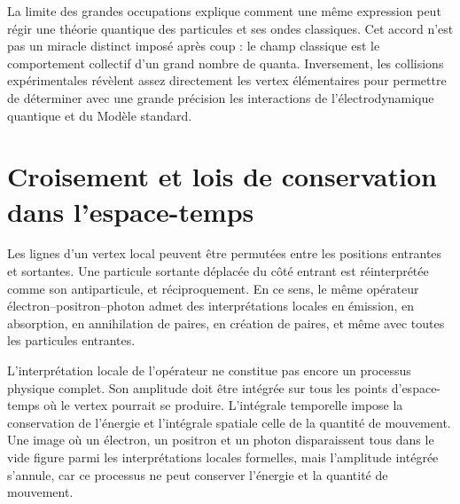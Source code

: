 La limite des grandes occupations explique comment une même expression peut régir une théorie quantique des particules et ses ondes classiques. Cet accord n’est pas un miracle distinct imposé après coup : le champ classique est le comportement collectif d’un grand nombre de quanta. Inversement, les collisions expérimentales révèlent assez directement les vertex élémentaires pour permettre de déterminer avec une grande précision les interactions de l’électrodynamique quantique et du Modèle standard.

\section{Croisement et lois de conservation dans l’espace-temps}

Les lignes d’un vertex local peuvent être permutées entre les positions entrantes et sortantes. Une particule sortante déplacée du côté entrant est réinterprétée comme son antiparticule, et réciproquement. En ce sens, le même opérateur électron--positron--photon admet des interprétations locales en émission, en absorption, en annihilation de paires, en création de paires, et même avec toutes les particules entrantes.

\begin{classroomqa}
\end{classroomqa}

L’interprétation locale de l’opérateur ne constitue pas encore un processus physique complet. Son amplitude doit être intégrée sur tous les points d’espace-temps où le vertex pourrait se produire. L’intégrale temporelle impose la conservation de l’énergie et l’intégrale spatiale celle de la quantité de mouvement. Une image où un électron, un positron et un photon disparaissent tous dans le vide figure parmi les interprétations locales formelles, mais l’amplitude intégrée s’annule, car ce processus ne peut conserver l’énergie et la quantité de mouvement.

\begin{classroomqa}
\end{classroomqa}

